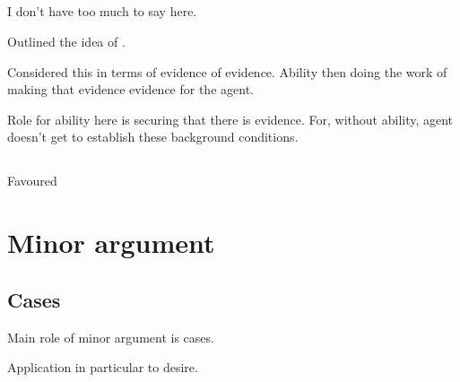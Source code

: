 \subsection{\AR{}}
\label{sec:ar-2}

\begin{note}
  I don't have too much to say here.

  Outlined the idea of \AR{}.

  Considered this in terms of evidence of evidence.
  Ability then doing the work of making that evidence evidence for the agent.

  Role for ability here is securing that there is evidence.
  For, without ability, agent doesn't get to establish these background conditions.
\end{note}

\subsection{\WR{}}
\label{sec:wr-2}

\begin{note}
  Favoured
\end{note}



\section{Minor argument}
\label{sec:posit-argumn-overv}

\subsection{Cases}
\label{sec:cases}

\begin{note}
  Main role of minor argument is cases.
\end{note}

\begin{note}
  Application in particular to desire.
\end{note}


